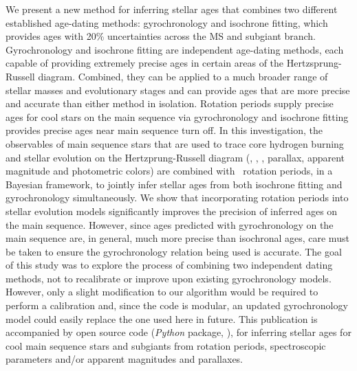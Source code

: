 We present a new method for inferring stellar ages that combines two different
established age-dating methods: gyrochronology and isochrone fitting, which
provides ages with 20\% uncertainties across the MS and subgiant branch.
Gyrochronology and isochrone fitting are independent age-dating methods, each
capable of providing extremely precise ages in certain areas of the
Hertzsprung-Russell diagram.
Combined, they can be applied to a much broader range of stellar masses and
evolutionary stages and can provide ages that are more precise and accurate
than either method in isolation.
Rotation periods supply precise ages for cool stars on the main sequence via
gyrochronology and isochrone fitting provides precise ages near main sequence
turn off.
In this investigation, the observables of main sequence stars that are used to
trace core hydrogen burning and stellar evolution on the Hertzprung-Russell
diagram (\teff, \feh, \logg, parallax, apparent magnitude and photometric
colors) are combined with \kepler\ rotation periods, in a Bayesian framework,
to jointly infer stellar ages from both isochrone fitting and gyrochronology
simultaneously.
We show that incorporating rotation periods into stellar evolution models
significantly improves the precision of inferred ages on the main sequence.
However, since ages predicted with gyrochronology on the main sequence are, in
general, much more precise than isochronal ages, care must be taken to ensure
the gyrochronology relation being used is accurate.
The goal of this study was to explore the process of combining two independent
dating methods, not to recalibrate or improve upon existing gyrochronology
models.
However, only a slight modification to our algorithm would be required to
perform a calibration and, since the code is modular, an updated
gyrochronology model could easily replace the one used here in future.
This publication is accompanied by open source code ({\it Python} package,
\sd), for inferring stellar ages for cool main sequence stars and subgiants
from rotation periods, spectroscopic parameters and/or apparent magnitudes and
parallaxes.
